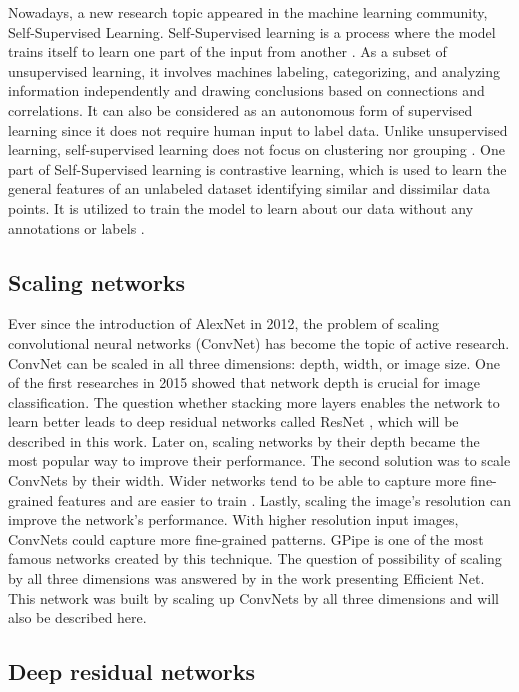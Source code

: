 \documentclass[
]{krantz}
\begin{document}
Nowadays, a new research topic appeared in the machine learning community, Self-Supervised Learning. Self-Supervised learning is a process where the model trains itself to learn one part of the input from another \citep{selfsup}. As a subset of unsupervised learning, it involves machines labeling, categorizing, and analyzing information independently and drawing conclusions based on connections and correlations. It can also be considered as an autonomous form of supervised learning since it does not require human input to label data. Unlike unsupervised learning, self-supervised learning does not focus on clustering nor grouping \citep{selfsup2}. One part of Self-Supervised learning is contrastive learning, which is used to learn the general features of an unlabeled dataset identifying similar and dissimilar data points. It is utilized to train the model to learn about our data without any annotations or labels \citep{contrastive}.

\hypertarget{scaling-networks}{%
\subsection{Scaling networks}\label{scaling-networks}}

Ever since the introduction of AlexNet in 2012, the problem of scaling convolutional neural networks (ConvNet) has become the topic of active research. ConvNet can be scaled in all three dimensions: depth, width, or image size. One of the first researches in 2015 showed that network depth is crucial for image classification. The question whether stacking more layers enables the network to learn better leads to deep residual networks called ResNet \citep{ResNet}, which will be described in this work. Later on, scaling networks by their depth became the most popular way to improve their performance.
The second solution was to scale ConvNets by their width. Wider networks tend to be able to capture more fine-grained features and are easier to train \citep{width}.
Lastly, scaling the image's resolution can improve the network's performance. With higher resolution input images, ConvNets could capture more fine-grained patterns. GPipe \citep{gpipe} is one of the most famous networks created by this technique.
The question of possibility of scaling by all three dimensions was answered by \citet{EfficientNet} in the work presenting Efficient Net. This network was built by scaling up ConvNets by all three dimensions and will also be described here.

\hypertarget{deep-residual-networks}{%
\subsection{Deep residual networks}\label{deep-residual-networks}}
\end{document}
